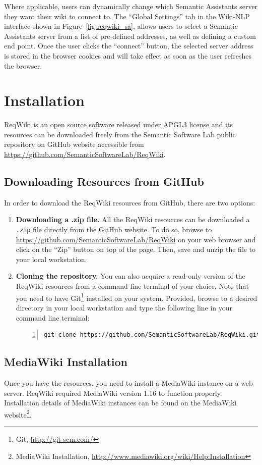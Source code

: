 \documentclass[10pt,twoside,openany,bibtotoc,liststotoc]{scrbook}
\newcommand{\blankline}{\vspace{5mm}}
\newcommand{\sa}{Semantic Assistants\xspace}
\begin{document}
Where applicable, users can dynamically change which \sa server they want their wiki to connect to. The ``Global Settings'' tab in the Wiki-NLP interface shown in Figure~\ref{fig:reqwiki_sa}, allows users to select a \sa server from a list of pre-defined addresses, as well as defining a custom end point. Once the user clicks the ``connect'' button, the selected server address is stored in the browser cookies and will take effect as soon as the user refreshes the browser.

\chapter{Installation}
\label{chap:install}
ReqWiki is an open source software released under APGL3 license and its resources can be downloaded freely from the Semantic Software Lab public repository on GitHub website accessible from \url{https://github.com/SemanticSoftwareLab/ReqWiki}.

\section{Downloading Resources from GitHub}
In order to download the ReqWiki resources from GitHub, there are two options:

\begin{enumerate}
\item \textbf{Downloading a .zip file. } All the ReqWiki resources can be downloaded a \texttt{.zip} file directly from the GitHub website. To do so, browse to \url{https://github.com/SemanticSoftwareLab/ReqWiki} on your web browser and click on the ``Zip'' button on top of the page. Then, save and unzip the file to your local workstation.
\item \textbf{Cloning the repository. } You can also acquire a read-only version of the ReqWiki resources from a command line terminal of your choice. Note that you need to have Git\footnote{Git, \url{http://git-scm.com/}} installed on your system. Provided, browse to a desired directory in your local workstation and type the following line in your command line terminal:
\blankline

\centering
\begin{lstlisting}[language=xml,numbers=left,xleftmargin=4mm,columns=flexible]
git clone https://github.com/SemanticSoftwareLab/ReqWiki.git
\end{lstlisting}
\end{enumerate}

\section{MediaWiki Installation}
Once you have the resources, you need to install a MediaWiki instance on a web server. ReqWiki required MediaWiki version 1.16 to function properly. Installation details of MediaWiki instances can be found on the MediaWiki website\footnote{MediaWiki Installation, \url{http://www.mediawiki.org/wiki/Help:Installation}}.
\end{document}
